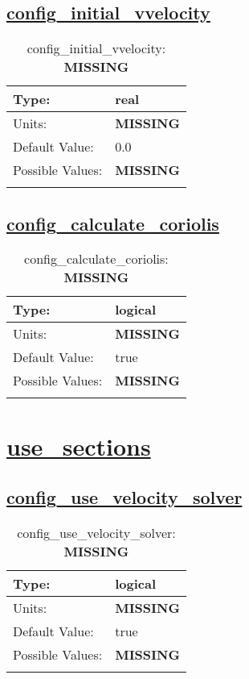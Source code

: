 \subsection[config\_initial\_vvelocity]{\hyperref[sec:nm_tab_initialize]{config\_initial\_vvelocity}}
\label{subsec:nm_sec_config_initial_vvelocity}
\begin{center}
\begin{longtable}{| p{2.0in} || p{4.0in} |}
    \hline
    Type: & real \\
    \hline
    Units: & {\bf \color{red} MISSING} \\
    \hline
    Default Value: & 0.0 \\
    \hline
    Possible Values: & {\bf \color{red} MISSING} \\
    \hline
    \caption{config\_initial\_vvelocity: {\bf \color{red} MISSING}}
\end{longtable}
\end{center}
\subsection[config\_calculate\_coriolis]{\hyperref[sec:nm_tab_initialize]{config\_calculate\_coriolis}}
\label{subsec:nm_sec_config_calculate_coriolis}
\begin{center}
\begin{longtable}{| p{2.0in} || p{4.0in} |}
    \hline
    Type: & logical \\
    \hline
    Units: & {\bf \color{red} MISSING} \\
    \hline
    Default Value: & true \\
    \hline
    Possible Values: & {\bf \color{red} MISSING} \\
    \hline
    \caption{config\_calculate\_coriolis: {\bf \color{red} MISSING}}
\end{longtable}
\end{center}
\section[use\_sections]{\hyperref[sec:nm_tab_use_sections]{use\_sections}}
\label{sec:nm_sec_use_sections}
\subsection[config\_use\_velocity\_solver]{\hyperref[sec:nm_tab_use_sections]{config\_use\_velocity\_solver}}
\label{subsec:nm_sec_config_use_velocity_solver}
\begin{center}
\begin{longtable}{| p{2.0in} || p{4.0in} |}
    \hline
    Type: & logical \\
    \hline
    Units: & {\bf \color{red} MISSING} \\
    \hline
    Default Value: & true \\
    \hline
    Possible Values: & {\bf \color{red} MISSING} \\
    \hline
    \caption{config\_use\_velocity\_solver: {\bf \color{red} MISSING}}
\end{longtable}
\end{center}
